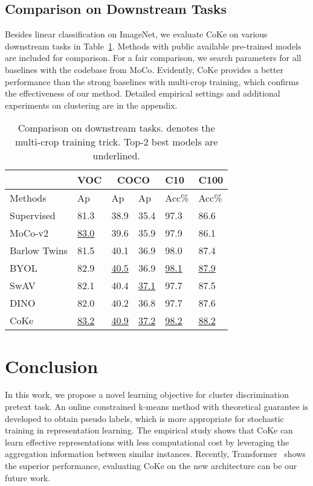 \documentclass[10pt,twocolumn,letterpaper]{article}
\begin{document}
\subsection{Comparison on Downstream Tasks}
Besides linear classification on ImageNet, we evaluate CoKe on various downstream tasks in Table~\ref{ta:ds}. Methods with public available pre-trained models are included for comparison. For a fair comparison, we search parameters for all baselines with the codebase from MoCo. Evidently, CoKe provides a better performance than the strong baselines with multi-crop training, which confirms the effectiveness of our method. Detailed empirical settings and additional experiments on clustering are in the appendix.

\begin{table}[!ht]
\centering
\small
\begin{tabular}{|l|l|l|l|l|l|}\hline
&VOC&\multicolumn{2}{c|}{COCO}&C10&C100\\\hline
Methods&Ap&Ap&Ap&Acc\%&Acc\%\\\hline
Supervised&81.3&38.9&35.4 &97.3&86.6\\\hline
MoCo-v2&\underline{83.0}&39.6&35.9&97.9&86.1\\\hline
Barlow Twins&81.5&40.1&36.9&98.0&87.4 \\\hline
BYOL& 82.9&\underline{40.5}&36.9&\underline{98.1}&\underline{87.9}  \\\hline
SwAV&82.1&40.4&\underline{37.1}&97.7&87.5 \\\hline
DINO&82.0&40.2&36.8&97.7& 87.6\\\hline
CoKe&\underline{83.2}&\underline{40.9}&\underline{37.2}&\underline{98.2}&\underline{88.2}\\\hline
\end{tabular}
\caption{Comparison on downstream tasks.  denotes the multi-crop training trick. Top-2 best models are underlined.}\label{ta:ds}
\end{table}


\section{Conclusion}\label{sec:conclude}
In this work, we propose a novel learning objective for cluster discrimination pretext task. An online constrained k-means method with theoretical guarantee is developed to obtain pseudo labels, which is more appropriate for stochastic training in representation learning. The empirical study shows that CoKe can learn effective representations with less computational cost by leveraging the aggregation information between similar instances. Recently, Transformer~\cite{DosovitskiyB0WZ21} shows the superior performance, evaluating CoKe on the new architecture can be our future work.
\end{document}
